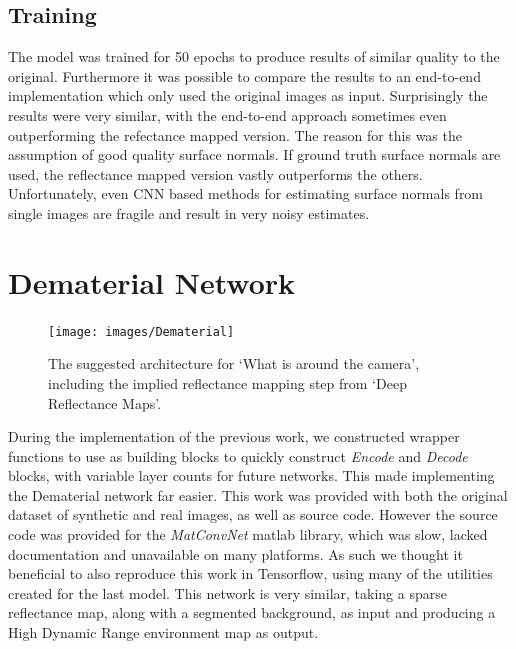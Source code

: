 \documentclass[ %
                    author={Gavin Parker},
                supervisor={Dr. Neill Campbell},
                    degree={MEng},
                     title={Deep Learning for Illumination Estimation from Stereo Images},
                  subtitle={},
                      type={Research},
                      year={2018} ]{dissertation}
\begin{document}
\subsection{Training}
The model was trained for 50 epochs to produce results of similar quality to the original. Furthermore it was possible to compare the results to an end-to-end implementation which only used the original images as input. Surprisingly the results were very similar, with the end-to-end approach sometimes even outperforming the refectance mapped version. The reason for this was the assumption of good quality surface normals. If ground truth surface normals are used, the reflectance mapped version vastly outperforms the others. Unfortunately, even CNN based methods for estimating surface normals from single images are fragile and result in very noisy estimates.
\section{Dematerial Network}
\begin{figure}[H]
\texttt{[image: images/Dematerial]}
\caption 
\newline
The suggested architecture for `What is around the camera', including the implied reflectance mapping step from `Deep Reflectance Maps'.
\end{figure}
During the implementation of the previous work, we constructed wrapper functions to use as building blocks to quickly construct \textit{Encode} and \textit{Decode} blocks, with variable layer counts for future networks. This made implementing the Dematerial network far easier. This work was provided with both the original dataset of synthetic and real images, as well as source code. However the source code was provided for the \textit{MatConvNet} matlab library, which was slow, lacked documentation and unavailable on many platforms. As such we thought it beneficial to also reproduce this work in Tensorflow, using many of the utilities created for the last model. This network is very similar, taking a sparse reflectance map, along with a segmented background, as input and producing a High Dynamic Range environment map as output.
\end{document}
